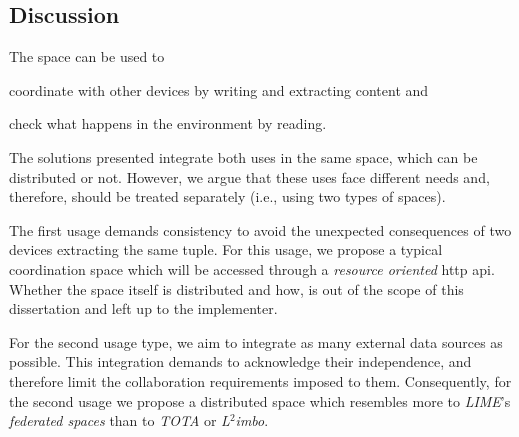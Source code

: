 \subsection{Discussion}

The space can be used to
\begin{enumerate*}[label=\itshape(\arabic*\upshape)]
  \item coordinate with other devices by writing and extracting content and
  \item check what happens in the environment by reading.
\end{enumerate*}
The solutions presented integrate both uses in the same space, which can be distributed or not.
However, we argue that these uses face different needs and, therefore, should be treated separately (i.e., using two types of spaces).


The first usage demands consistency to avoid the unexpected consequences of two devices extracting the same tuple.
For this usage, we propose a typical coordination space which will be accessed through a \emph{resource oriented} \ac{http} \ac{api}.
Whether the space itself is distributed and how, is out of the scope of this dissertation and left up to the implementer.


For the second usage type, we aim to integrate as many external data sources as possible.
This integration demands to acknowledge their independence, and therefore limit the collaboration requirements imposed to them.
Consequently, for the second usage we propose a distributed space which resembles more to \emph{LIME}'s \emph{federated spaces} than to \emph{TOTA} or \emph{L$^2$imbo}.


